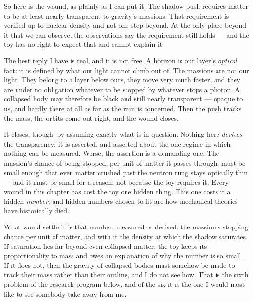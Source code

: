 So here is the wound, as plainly as I can put it. The shadow push requires matter to be at least nearly transparent to gravity's massions. That requirement is verified up to nuclear density and not one step beyond. At the only place beyond it that we can observe, the observations say the requirement still holds --- and the toy has no right to expect that and cannot explain it.

The best reply I have is real, and it is not free. A horizon is our layer's \emph{optical} fact: it is defined by what our light cannot climb out of. The massions are not our light. They belong to a layer below ours, they move very much faster, and they are under no obligation whatever to be stopped by whatever stops a photon. A collapsed body may therefore be black and still nearly transparent --- opaque to us, and hardly there at all as far as the rain is concerned. Then the push tracks the mass, the orbits come out right, and the wound closes.

It closes, though, by assuming exactly what is in question. Nothing here \emph{derives} the transparency; it is asserted, and asserted about the one regime in which nothing can be measured. Worse, the assertion is a demanding one. The massion's chance of being stopped, per unit of matter it passes through, must be small enough that even matter crushed past the neutron rung stays optically thin --- and it must be small for a reason, not because the toy requires it. Every wound in this chapter has cost the toy one hidden thing. This one costs it a hidden \emph{number}, and hidden numbers chosen to fit are how mechanical theories have historically died.

What would settle it is that number, measured or derived: the massion's stopping chance per unit of matter, and with it the density at which the shadow saturates. If saturation lies far beyond even collapsed matter, the toy keeps its proportionality to mass and owes an explanation of why the number is so small. If it does not, then the gravity of collapsed bodies must somehow be made to track their mass rather than their outline, and I do not see how. That is the sixth problem of the research program below, and of the six it is the one I would most like to see somebody take away from me.

